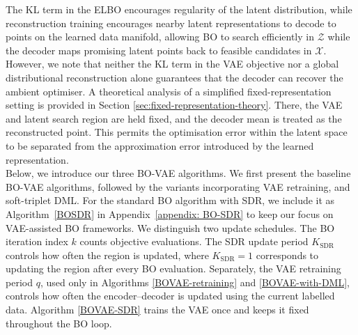 \documentclass[pdflatex,sn-mathphys-num]{sn-jnl}%
\theoremstyle{thmstyleone}%
\theoremstyle{thmstyletwo}%
\theoremstyle{thmstylethree}%
\begin{document}
The KL term in the ELBO encourages regularity of the latent distribution, while reconstruction training encourages nearby latent representations to decode to points on the learned data manifold, allowing BO to search efficiently in \(\mathcal{Z}\) while the decoder maps promising latent points back to feasible candidates in \(\mathcal{X}\). However, we note that neither the KL term in the VAE objective nor a global distributional reconstruction alone guarantees that the decoder can recover the ambient optimiser. A theoretical analysis of a simplified fixed-representation setting is provided in Section \ref{sec:fixed-representation-theory}. There, the VAE and latent search region are held fixed, and the decoder mean is treated as the reconstructed point. This permits the optimisation error within the latent space to be separated from the approximation error introduced by the learned representation.\\

Below, we introduce our three BO-VAE algorithms. We first present the baseline BO-VAE algorithms, followed by the variants incorporating VAE retraining, and soft-triplet DML. For the standard BO algorithm with SDR, we include it as Algorithm~\ref{BOSDR} in Appendix~\ref{appendix: BO-SDR} to keep our focus on VAE-assisted BO frameworks. We distinguish two update schedules. The BO iteration index \(k\) counts objective evaluations. The SDR update period \(K_\mathrm{SDR}\) controls how often the region is updated, where \(K_\mathrm{SDR}=1\) corresponds to updating the region after every BO evaluation. Separately, the VAE retraining period \(q\), used only in Algorithms \ref{BOVAE-retraining} and \ref{BOVAE-with-DML}, controls how often the encoder--decoder is updated using the current labelled data. Algorithm \ref{BOVAE-SDR} trains the VAE once and keeps it fixed throughout the BO loop.
\end{document}
